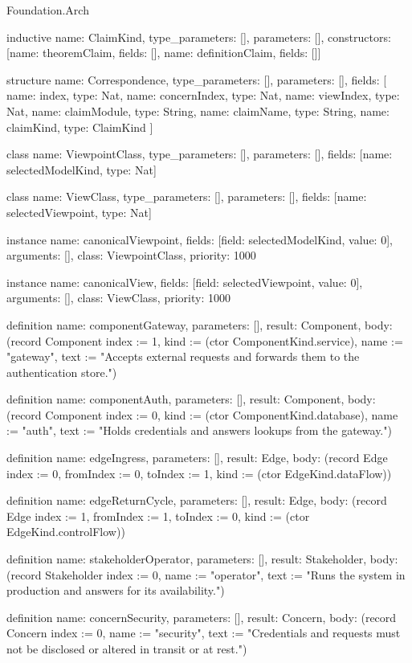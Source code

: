 \begin{lexlean}{Foundation.Arch}
\begin{semanticmodule}
inductive{
  name: ClaimKind,
  type_parameters: [],
  parameters: [],
  constructors: [{name: theoremClaim, fields: []}, {name: definitionClaim, fields: []}]
}

structure{
  name: Correspondence,
  type_parameters: [],
  parameters: [],
  fields: [
    {name: index, type: Nat},
    {name: concernIndex, type: Nat},
    {name: viewIndex, type: Nat},
    {name: claimModule, type: String},
    {name: claimName, type: String},
    {name: claimKind, type: ClaimKind}
  ]
}

class{
  name: ViewpointClass,
  type_parameters: [],
  parameters: [],
  fields: [{name: selectedModelKind, type: Nat}]
}

class{
  name: ViewClass,
  type_parameters: [],
  parameters: [],
  fields: [{name: selectedViewpoint, type: Nat}]
}

instance{
  name: canonicalViewpoint,
  fields: [{field: selectedModelKind, value: 0}],
  arguments: [],
  class: ViewpointClass,
  priority: 1000
}

instance{
  name: canonicalView,
  fields: [{field: selectedViewpoint, value: 0}],
  arguments: [],
  class: ViewClass,
  priority: 1000
}

definition{
  name: componentGateway,
  parameters: [],
  result: Component,
  body: (record Component {index := 1, kind := (ctor ComponentKind.service), name := "gateway", text := "Accepts external requests and forwards them to the authentication store."})
}

definition{
  name: componentAuth,
  parameters: [],
  result: Component,
  body: (record Component {index := 0, kind := (ctor ComponentKind.database), name := "auth", text := "Holds credentials and answers lookups from the gateway."})
}

definition{
  name: edgeIngress,
  parameters: [],
  result: Edge,
  body: (record Edge {index := 0, fromIndex := 0, toIndex := 1, kind := (ctor EdgeKind.dataFlow)})
}

definition{
  name: edgeReturnCycle,
  parameters: [],
  result: Edge,
  body: (record Edge {index := 1, fromIndex := 1, toIndex := 0, kind := (ctor EdgeKind.controlFlow)})
}

definition{
  name: stakeholderOperator,
  parameters: [],
  result: Stakeholder,
  body: (record Stakeholder {index := 0, name := "operator", text := "Runs the system in production and answers for its availability."})
}

definition{
  name: concernSecurity,
  parameters: [],
  result: Concern,
  body: (record Concern {index := 0, name := "security", text := "Credentials and requests must not be disclosed or altered in transit or at rest."})
}


\end{semanticmodule}
\end{lexlean}

